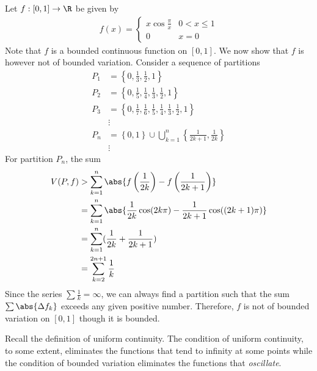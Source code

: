 \documentclass[thmcnt=section, 12pt]{elegantbook}
\begin{document}
\begin{example} \label{eg:4}
    Let $f: [0, 1] \to \R$ be given by 
    \begin{align*}
        f(x) = \begin{cases}
            x\cos \frac{\pi}{x} &0 < x \leq 1 \\
            0 &x = 0
        \end{cases}
    \end{align*}
    Note that $f$ is a bounded continuous function on $[0, 1]$. We now show that $f$ is however not of bounded variation. Consider a sequence of partitions 
    \begin{align*}
        P_1 &= \left\{
            0, \frac{1}{3}, \frac{1}{2}, 1
        \right\} \\ 
        P_2 &= \left\{
            0, 
            \frac{1}{5}, \frac{1}{4},
            \frac{1}{3}, \frac{1}{2}, 
            1
        \right\} \\ 
        P_3 &= \left\{
            0, 
            \frac{1}{7}, \frac{1}{6},
            \frac{1}{5}, \frac{1}{4},
            \frac{1}{3}, \frac{1}{2}, 
            1
        \right\} \\ 
        &\vdots \\ 
        P_n &= \left\{
            0, 1
        \right\} \cup \bigcup_{k=1}^n \left\{
            \frac{1}{2k+1}, \frac{1}{2k}
        \right\} \\ 
        &\vdots
    \end{align*}
    For partition $P_n$, the sum 
    \begin{align*}
        V(P, f)
        &> \sum_{k=1}^n \abs{
            f\left(\frac{1}{2k}\right) 
            - f\left(\frac{1}{2k+1}\right)
        } \\
        &= \sum_{k=1}^n \abs{
            \frac{1}{2k}\cos(2k\pi) 
            - \frac{1}{2k+1}\cos((2k+1)\pi)
        } \\ 
        &= \sum_{k=1}^n (
            \frac{1}{2k}
            + \frac{1}{2k+1}
        ) \\ 
        &= \sum_{k=2}^{2n+1} \frac{1}{k}
    \end{align*}
    Since the series $\sum \frac{1}{k} = \infty$, we can always find a partition such that the sum $\sum \abs{\Delta f_k}$ exceeds any given positive number. Therefore, $f$ is not of bounded variation on $[0, 1]$ though it is bounded.
\end{example}

\par Recall the definition of uniform continuity. The condition of uniform continuity, to some extent, eliminates the functions that tend to infinity at some points while the condition of bounded variation eliminates the functions that \textit{oscillate}. 
\end{document}
